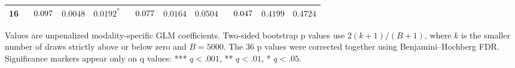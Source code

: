 \begin{table}[htbp]
{\begin{tabular}{lccccccccc}
16 & $\hphantom{-}0.097$ & $0.0048$ & $0.0192^{*}$ & $\hphantom{-}0.077$ & $0.0164$ & $0.0504$ & $\hphantom{-}0.047$ & $0.4199$ & $0.4724$ \\
\bottomrule
\end{tabular}%
}
\vspace{4pt}
\par\noindent
\begin{minipage}{\linewidth}\small
Values are unpenalized modality-specific GLM coefficients. Two-sided bootstrap p values use $2(k+1)/(B+1)$, where $k$ is the smaller number of draws strictly above or below zero and $B=5000$. The 36 p values were corrected together using Benjamini--Hochberg FDR. Significance markers appear only on q values: *** $q<.001$, ** $q<.01$, * $q<.05$.
\end{minipage}
\end{table}

